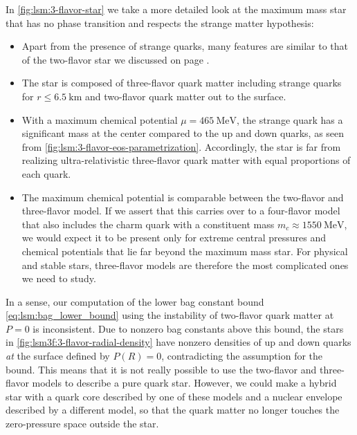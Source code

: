 In \cref{fig:lsm:3-flavor-star} we take a more detailed look at the maximum mass star that has no phase transition and respects the strange matter hypothesis:
\begin{itemize}
\item Apart from the presence of strange quarks, many features are similar to that of the two-flavor star we discussed on page \pageref{list:lsm:2-flavor-star-discussion}.
\item The star is composed of three-flavor quark matter including strange quarks for $r \leq \SI{6.5}{\kilo\meter}$ and two-flavor quark matter out to the surface.
\item With a maximum chemical potential $\mu=\SI{465}{\mega\electronvolt}$, the strange quark has a significant mass at the center compared to the up and down quarks, as seen from \cref{fig:lsm:3-flavor-eos-parametrization}.
      Accordingly, the star is far from realizing ultra-relativistic three-flavor quark matter with equal proportions of each quark.
\item The maximum chemical potential is comparable between the two-flavor and three-flavor model.
      If we assert that this carries over to a four-flavor model that also includes the charm quark with a constituent mass $m_c \approx \SI{1550}{\mega\electronvolt}$,
      we would expect it to be present only for extreme central pressures and chemical potentials that lie far beyond the maximum mass star.
      For physical and stable stars, three-flavor models are therefore the most complicated ones we need to study.
\end{itemize}

In a sense, our computation of the lower bag constant bound \eqref{eq:lsm:bag_lower_bound} using the instability of two-flavor quark matter at $P=0$ is inconsistent.
Due to nonzero bag constants above this bound, the stars in \cref{fig:lsm3f:3-flavor-radial-density} have nonzero densities of up and down quarks \emph{at} the surface defined by $P(R)=0$, contradicting the assumption for the bound.
This means that it is not really possible to use the two-flavor and three-flavor models to describe a pure quark star.
However, we could make a hybrid star with a quark core described by one of these models and a nuclear envelope described by a different model, so that the quark matter no longer touches the zero-pressure space outside the star.

